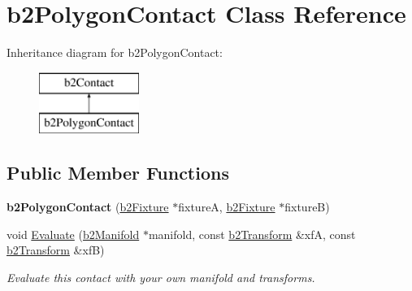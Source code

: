 \hypertarget{classb2_polygon_contact}{\section{b2\-Polygon\-Contact Class Reference}
\label{classb2_polygon_contact}
}
Inheritance diagram for b2\-Polygon\-Contact\-:\begin{figure}[H]
\begin{center}
\leavevmode
\includegraphics[height=2.000000cm]{classb2_polygon_contact}
\end{center}
\end{figure}
\subsection*{Public Member Functions}
\begin{DoxyCompactItemize}
\item 
\hypertarget{classb2_polygon_contact_a93cabf086e75ae40dcd1881760c71c63}{{\bfseries b2\-Polygon\-Contact} (\hyperlink{classb2_fixture}{b2\-Fixture} $\ast$fixture\-A, \hyperlink{classb2_fixture}{b2\-Fixture} $\ast$fixture\-B)}\label{classb2_polygon_contact_a93cabf086e75ae40dcd1881760c71c63}

\item 
\hypertarget{classb2_polygon_contact_ae75f78bb52c76fc4fffda4d91e62d354}{void \hyperlink{classb2_polygon_contact_ae75f78bb52c76fc4fffda4d91e62d354}{Evaluate} (\hyperlink{structb2_manifold}{b2\-Manifold} $\ast$manifold, const \hyperlink{structb2_transform}{b2\-Transform} \&xf\-A, const \hyperlink{structb2_transform}{b2\-Transform} \&xf\-B)}\label{classb2_polygon_contact_ae75f78bb52c76fc4fffda4d91e62d354}

\begin{DoxyCompactList}\small\item\em Evaluate this contact with your own manifold and transforms. \end{DoxyCompactList}\end{DoxyCompactItemize}
